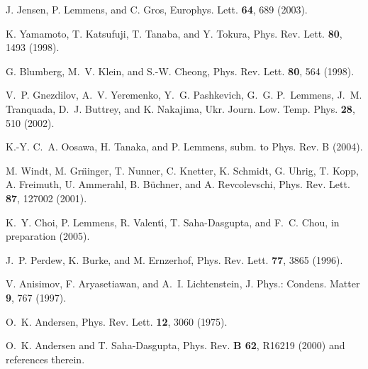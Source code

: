 \documentclass[prb,preprint,draft,amsmath,showpacs]{revtex4}
\begin{document}
\begin{thebibliography}{10}
J. Jensen, P. Lemmens, and C. Gros, Europhys. Lett. {\bf 64},  689  (2003).

K. Yamamoto, T. Katsufuji, T. Tanaba, and Y. Tokura, Phys. Rev. Lett. {\bf 80},
   1493  (1998).

G. Blumberg, M.~V. Klein, and S.-W. Cheong, Phys. Rev. Lett. {\bf 80},  564
  (1998).

V.~P. Gnezdilov, A.~V. Yeremenko, Y.~G. Pashkevich, G.~G. P.~Lemmens, J.~M.
  Tranquada, D.~J. Buttrey, and K. Nakajima, Ukr. Journ. Low. Temp. Phys. {\bf
  28},  510  (2002).

K.-Y. C.~A. Oosawa, H. Tanaka, and P. Lemmens, subm. to Phys. Rev. B  (2004).

M. Windt, M. Gr\"ninger, T. Nunner, C. Knetter, K. Schmidt, G. Uhrig, T. Kopp,
  A. Freimuth, U. Ammerahl, B. B\"uchner, and A. Revcolevschi, Phys. Rev. Lett.
  {\bf 87},  127002  (2001).

K.~Y. Choi, P. Lemmens, R. Valent{\'{\i}}, T. Saha-Dasgupta, and F.~C. Chou, in
  preparation  (2005).

J.~P. Perdew, K. Burke, and M. Ernzerhof, Phys. Rev. Lett. {\bf 77},  3865
  (1996).

V. Anisimov, F. Aryasetiawan, and A.~I. Lichtenstein, J. Phys.: Condens. Matter
  {\bf 9},  767  (1997).

O.~K. Andersen, Phys. Rev. Lett. {\bf 12},  3060  (1975).

O.~K. Andersen and T. Saha-Dasgupta, Phys. Rev. {\bf B 62},  R16219  (2000)  and
references therein.

\end{thebibliography}
\end{document}
